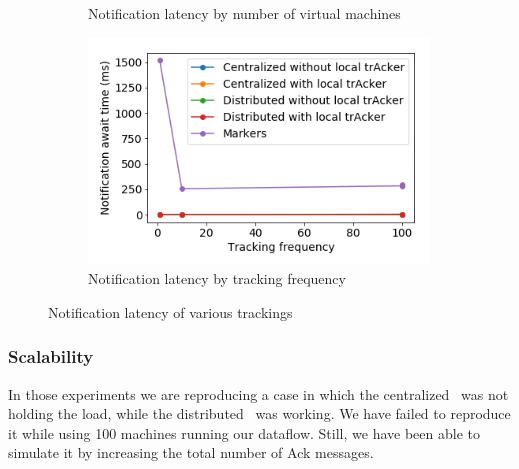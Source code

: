 \begin{figure}[t!]
\begin{subfigure}[b]{0.32\textwidth}
            \caption{Notification latency by number of virtual machines}
    \end{subfigure}
    \hspace{5mm}
    \begin{subfigure}[b]{0.32\textwidth}
            \includegraphics[width=0.99\textwidth]{pics/notification_await_time_by_tracking_frequency.png}
            \caption{Notification latency by tracking frequency}
	\end{subfigure}
    \caption{Notification latency of various trackings}
\end{figure}

\subsubsection{Scalability}

In those experiments we are reproducing a case in which the centralized \tracker\ was not holding the load, while the distributed \tracker\ was working. We have failed to reproduce it while using 100 machines running our dataflow. Still, we have been able to simulate it by increasing the total number of Ack messages.

